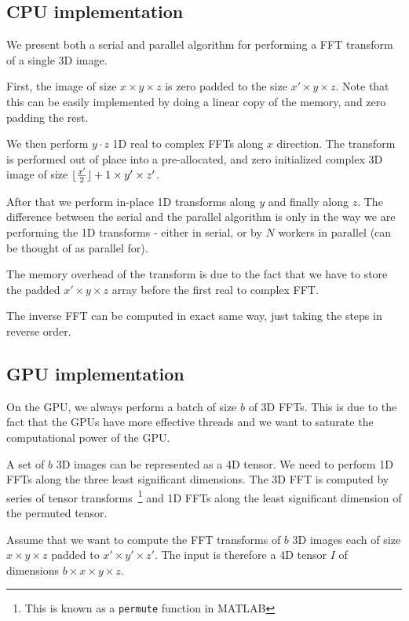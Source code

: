 \documentclass[conference]{IEEEtran}
\DeclarePairedDelimiter{\floor}{\lfloor}{\rfloor}
\begin{document}
\subsection{CPU implementation}

We present both a serial and parallel algorithm for performing a FFT
transform of a single 3D image.

First, the image of size $x \times y \times z$ is zero padded to the
size $x' \times y \times z$.  Note that this can be easily implemented
by doing a linear copy of the memory, and zero padding the rest.

We then perform $y \cdot z$ 1D real to complex FFTs along $x$
direction.  The transform is performed out of place into a
pre-allocated, and zero initialized complex 3D image of size
$\floor{\frac{x'}{2}} + 1 \times y' \times z'$.

After that we perform in-place 1D transforms along $y$ and finally
along $z$.  The difference between the serial and the parallel
algorithm is only in the way we are performing the 1D transforms -
either in serial, or by $N$ workers in parallel (can be thought of as
parallel for).

The memory overhead of the transform is due to the fact that we have
to store the padded $x' \times y \times z$ array before the first real
to complex FFT.

The inverse FFT can be computed in exact same way, just taking the
steps in reverse order.

\subsection{GPU implementation}

On the GPU, we always perform a batch of size $b$ of 3D FFTs.  This is
due to the fact that the GPUs have more effective threads and we want
to saturate the computational power of the GPU.

A set of $b$ 3D images can be represented as a 4D tensor.  We need to
perform 1D FFTs along the three least significant dimensions.  The 3D
FFT is computed by series of tensor transforms~\footnote{This is known
as a \texttt{permute} function in MATLAB} and 1D FFTs along the least
significant dimension of the permuted tensor.

Assume that we want to compute the FFT transforms of $b$ 3D images
each of size $x \times y \times z$ padded to $x' \times y' \times z'$.
The input is therefore a 4D tensor $I$ of dimensions $b \times
x \times y \times z$.
\end{document}
